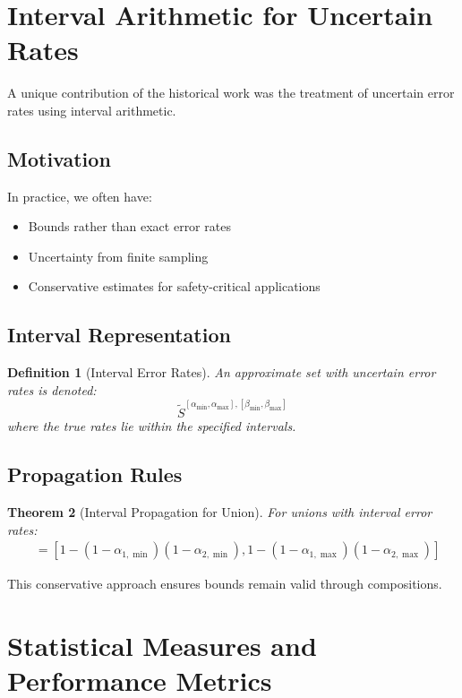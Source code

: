 \documentclass[11pt]{article}
\newtheorem{theorem}{Theorem}[section]
\newtheorem{definition}[theorem]{Definition}
\newcommand{\observed}[1]{\tilde{#1}}  %
\newcommand{\union}{\cup}
\newcommand{\fprate}{\alpha}  %
\newcommand{\fnrate}{\beta}   %
\begin{document}
\section{Interval Arithmetic for Uncertain Rates}
\label{sec:intervals}

A unique contribution of the historical work was the treatment of uncertain error rates using interval arithmetic.

\subsection{Motivation}

In practice, we often have:
\begin{itemize}
\item Bounds rather than exact error rates
\item Uncertainty from finite sampling
\item Conservative estimates for safety-critical applications
\end{itemize}

\subsection{Interval Representation}

\begin{definition}[Interval Error Rates]
An approximate set with uncertain error rates is denoted:
$$\observed{S}^{[\fprate_{\min}, \fprate_{\max}], [\fnrate_{\min}, \fnrate_{\max}]}$$
where the true rates lie within the specified intervals.
\end{definition}

\subsection{Propagation Rules}

\begin{theorem}[Interval Propagation for Union]
For unions with interval error rates:
\begin{align}
[\fprate_{\union,\min}, \fprate_{\union,\max}] &= [1-(1-\fprate_{1,\min})(1-\fprate_{2,\min}), 1-(1-\fprate_{1,\max})(1-\fprate_{2,\max})]
\end{align}
\end{theorem}

This conservative approach ensures bounds remain valid through compositions.

\section{Statistical Measures and Performance Metrics}
\label{sec:metrics}
\end{document}
